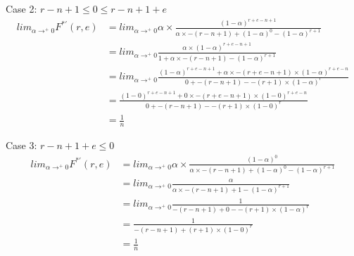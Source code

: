 \documentclass{dalcsthesis}
\begin{document}
Case 2: $r-n+1 \leq 0 \leq r-n+1+e$ 
\begin{align*}
lim_{\alpha \rightarrow^{+} 0} F^{*'}(r, e)
  &= lim_{\alpha \rightarrow^{+} 0} \alpha \times \frac{(1-\alpha)^{r + e - n + 1}}{\alpha \times -(r-n+1) + (1-\alpha)^0 - (1-\alpha)^{r+1}}
\\&= lim_{\alpha \rightarrow^{+} 0} \frac{\alpha \times (1-\alpha)^{r + e - n + 1}}{1 + \alpha \times -(r-n+1) - (1-\alpha)^{r+1}}
\\&= lim_{\alpha \rightarrow^{+} 0} \frac{(1-\alpha)^{r + e - n + 1} + \alpha \times -(r + e - n + 1) \times (1-\alpha)^{r + e - n}}{0 + -(r-n+1) - -(r+1) \times (1-\alpha)^r}
\\&= \frac{(1-0)^{r + e - n + 1} + 0 \times -(r + e - n + 1) \times (1-0)^{r + e - n}}{0 + -(r-n+1) - -(r+1) \times (1-0)^r}
\\&= \frac{1}{n}
\end{align*} 

Case 3: $r-n+1+e \leq 0$ 
\begin{align*}
lim_{\alpha \rightarrow^{+} 0} F^{*'}(r, e)
  &= lim_{\alpha \rightarrow^{+} 0} \alpha \times \frac{(1-\alpha)^0}{\alpha \times -(r-n+1) + (1-\alpha)^0 - (1-\alpha)^{r+1}}
\\&= lim_{\alpha \rightarrow^{+} 0} \frac{\alpha}{\alpha \times -(r-n+1) + 1 - (1-\alpha)^{r+1}}
\\&= lim_{\alpha \rightarrow^{+} 0} \frac{1}{-(r-n+1) + 0 - -(r+1) \times (1-\alpha)^r}
\\&= \frac{1}{-(r-n+1) + (r+1) \times (1-0)^r}
\\&= \frac{1}{n}
\end{align*} 
\end{document}
